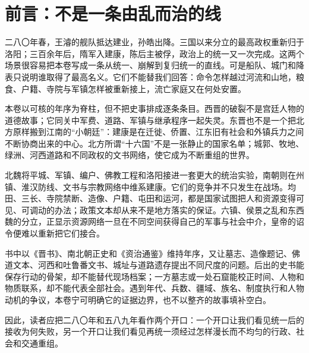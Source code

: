 \chapter*{前言：不是一条由乱而治的线}

二八〇年春，王濬的舰队抵达建业，孙皓出降。三国以来分立的最高政权重新归于洛阳；三百余年后，隋军入建康，陈后主被俘，政治上的统一又一次完成。这两个场景很容易把本卷写成一条从统一、崩解到复归统一的直线。可是船队、城门和降表只说明谁取得了最高名义。它们不能替我们回答：命令怎样越过河流和山地，粮食、户籍、寺院与军镇怎样被重新接上，流亡家庭又在何处安置。

本卷以可核的年序为脊柱，但不把史事排成逐条条目。西晋的破裂不是宫廷人物的道德故事；它同关中军费、道路、军镇与继承程序一起失灵。东晋也不是一个把北方原样搬到江南的“小朝廷”：建康是在迁徙、侨置、江东旧有社会和外镇兵力之间不断协商出来的中心。北方所谓“十六国”不是一张静止的国家名单；城郭、牧地、绿洲、河西道路和不同政权的文书网络，使它成为不断重组的世界。

北魏将平城、军镇、编户、佛教工程和洛阳接进一套更大的统治实验，南朝则在州镇、淮汉防线、文书与宗教网络中维系建康。它们的竞争并不只发生在战场。均田、三长、寺院禁断、造像、户籍、屯田和运河，都是国家试图把人和资源变得可见、可调动的办法；政策文本却从来不是地方落实的保证。六镇、侯景之乱和东西魏的分立，正显示资源网络一旦在不同空间获得自己的军事与社会中介，皇帝的诏令便难以重新把它们接合。

书中以《晋书》、南北朝正史和《资治通鉴》维持年序，又让墓志、造像题记、佛道文本、河西和吐鲁番文书、城址与道路遗存提出不同尺度的问题。后出的史书能保存行动的骨架，却不能替代现场档案；一方墓志或一处石窟能校正时间、人物和物质联系，却不能代表全部社会。遇到年代、兵数、疆域、族名、制度执行和人物动机的争议，本卷宁可明确它的证据边界，也不以整齐的故事填补空白。

因此，读者应把二八〇年和五八九年看作两个开口：一个开口让我们看见统一后的接收为何失败，另一个开口让我们看见再统一须经过怎样漫长而不均匀的行政、社会和交通重组。
